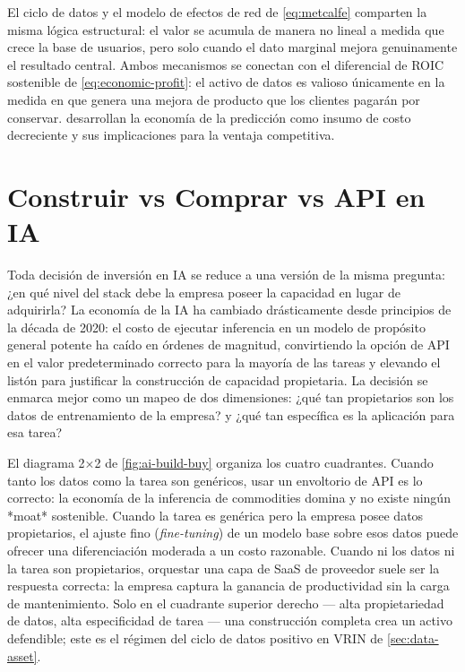 El ciclo de datos y el modelo de efectos de red de \cref{eq:metcalfe} comparten la misma lógica
estructural: el valor se acumula de manera no lineal a medida que crece la base de usuarios, pero
solo cuando el dato marginal mejora genuinamente el resultado central. Ambos mecanismos se conectan
con el diferencial de ROIC sostenible de \cref{eq:economic-profit}: el activo de datos es valioso
únicamente en la medida en que genera una mejora de producto que los clientes pagarán por conservar.
\textcite{agrawal2018prediction} desarrollan la economía de la predicción como insumo de costo
decreciente y sus implicaciones para la ventaja competitiva.

\section{Construir vs Comprar vs API en IA}\label{sec:ai-build-buy}

Toda decisión de inversión en IA se reduce a una versión de la misma pregunta: ¿en qué nivel del
stack debe la empresa poseer la capacidad en lugar de adquirirla? La economía de la IA ha cambiado
drásticamente desde principios de la década de 2020: el costo de ejecutar inferencia en un modelo
de propósito general potente ha caído en órdenes de magnitud, convirtiendo la opción de API en el
valor predeterminado correcto para la mayoría de las tareas y elevando el listón para justificar
la construcción de capacidad propietaria. La decisión se enmarca mejor como un mapeo de dos
dimensiones: ¿qué tan propietarios son los datos de entrenamiento de la empresa? y ¿qué tan
específica es la aplicación para esa tarea?

El diagrama 2×2 de \cref{fig:ai-build-buy} organiza los cuatro cuadrantes. Cuando tanto los datos
como la tarea son genéricos, usar un envoltorio de API es lo correcto: la economía de la inferencia
de commodities domina y no existe ningún *moat* sostenible. Cuando la tarea es genérica pero la
empresa posee datos propietarios, el ajuste fino (\emph{fine-tuning}) de un modelo base sobre esos
datos puede ofrecer una diferenciación moderada a un costo razonable. Cuando ni los datos ni la
tarea son propietarios, orquestar una capa de SaaS de proveedor suele ser la respuesta correcta:
la empresa captura la ganancia de productividad sin la carga de mantenimiento. Solo en el cuadrante
superior derecho — alta propietariedad de datos, alta especificidad de tarea — una construcción
completa crea un activo defendible; este es el régimen del ciclo de datos positivo en VRIN de
\cref{sec:data-asset}.

